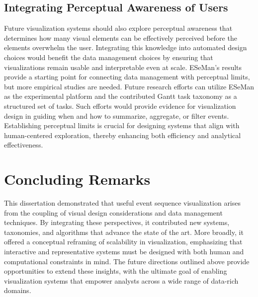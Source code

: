 \begin{refsection}
\subsection{Integrating Perceptual Awareness of Users}
Future visualization systems should also explore perceptual awareness that determines how many visual elements can be effectively perceived before the elements overwhelm the user. Integrating this knowledge into automated design choices would benefit the data management choices by ensuring that visualizations remain usable and interpretable even at scale. ESeMan's results provide a starting point for connecting data management with perceptual limits, but more empirical studies are needed. Future research efforts can utilize ESeMan as the experimental platform and the contributed Gantt task taxonomy as a structured set of tasks. Such efforts would provide evidence for visualization design in guiding when and how to summarize, aggregate, or filter events. Establishing perceptual limits is crucial for designing systems that align with human-centered exploration, thereby enhancing both efficiency and analytical effectiveness.

\section{Concluding Remarks}
This dissertation demonstrated that useful event sequence visualization arises from the coupling of visual design considerations and data management techniques. By integrating these perspectives, it contributed new systems, taxonomies, and algorithms that advance the state of the art. More broadly, it offered a conceptual reframing of scalability in visualization, emphasizing that interactive and representative systems must be designed with both human and computational constraints in mind. The future directions outlined above provide opportunities to extend these insights, with the ultimate goal of enabling visualization systems that empower analysts across a wide range of data-rich domains.

\printbibliography[heading=subbibnumbered]
\end{refsection}
